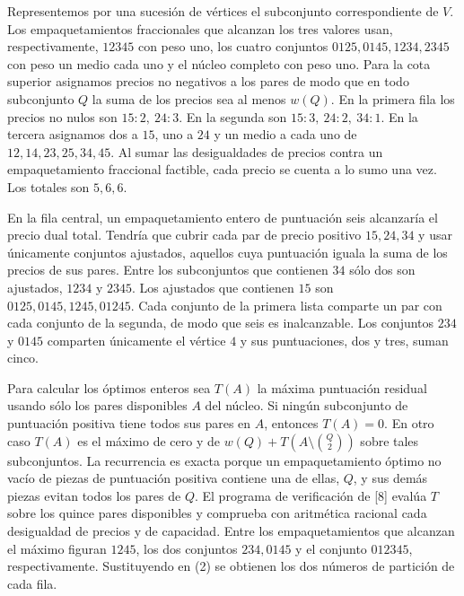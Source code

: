 \documentclass[spanish,11pt,a4paper]{article}
\begin{document}
Representemos por una sucesión de vértices el subconjunto correspondiente de \(V\). Los empaquetamientos fraccionales que alcanzan los tres valores usan, respectivamente, \(12345\) con peso uno, los cuatro conjuntos \(0125,0145,1234,2345\) con peso un medio cada uno y el núcleo completo con peso uno. Para la cota superior asignamos precios no negativos a los pares de modo que en todo subconjunto \(Q\) la suma de los precios sea al menos \(w(Q)\). En la primera fila los precios no nulos son \(15:2,\ 24:3\). En la segunda son \(15:3,\ 24:2,\ 34:1\). En la tercera asignamos dos a \(15\), uno a \(24\) y un medio a cada uno de \(12,14,23,25,34,45\). Al sumar las desigualdades de precios contra un empaquetamiento fraccional factible, cada precio se cuenta a lo sumo una vez. Los totales son \(5,6,6\).

En la fila central, un empaquetamiento entero de puntuación seis alcanzaría el precio dual total. Tendría que cubrir cada par de precio positivo \(15,24,34\) y usar únicamente conjuntos ajustados, aquellos cuya puntuación iguala la suma de los precios de sus pares. Entre los subconjuntos que contienen \(34\) sólo dos son ajustados, \(1234\) y \(2345\). Los ajustados que contienen \(15\) son \(0125,0145,1245,01245\). Cada conjunto de la primera lista comparte un par con cada conjunto de la segunda, de modo que seis es inalcanzable. Los conjuntos \(234\) y \(0145\) comparten únicamente el vértice \(4\) y sus puntuaciones, dos y tres, suman cinco.

Para calcular los óptimos enteros sea \(T(A)\) la máxima puntuación residual usando sólo los pares disponibles \(A\) del núcleo. Si ningún subconjunto de puntuación positiva tiene todos sus pares en \(A\), entonces \(T(A)=0\). En otro caso \(T(A)\) es el máximo de cero y de \(w(Q)+T(A\setminus\binom Q2)\) sobre tales subconjuntos. La recurrencia es exacta porque un empaquetamiento óptimo no vacío de piezas de puntuación positiva contiene una de ellas, \(Q\), y sus demás piezas evitan todos los pares de \(Q\). El programa de verificación de {[}8{]} evalúa \(T\) sobre los quince pares disponibles y comprueba con aritmética racional cada desigualdad de precios y de capacidad. Entre los empaquetamientos que alcanzan el máximo figuran \(1245\), los dos conjuntos \(234,0145\) y el conjunto \(012345\), respectivamente. Sustituyendo en (2) se obtienen los dos números de partición de cada fila.
\end{document}
